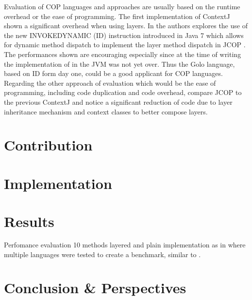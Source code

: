\documentclass[a4paper]{article}
\begin{document}
Evaluation of COP languages and approaches are usually based on the runtime overhead or the ease of programming. The first implementation of ContextJ \cite{haupt_contextj:_2011} shown a significant overhead when using layers. In \cite{appeltauer_layered_2010} the authors explores the use of the new INVOKEDYNAMIC (ID) instruction introduced in Java 7 which allows for dynamic method dispatch to implement the layer method dispatch in JCOP \cite{appeltauer_declarative_2013}. The performances shown are encouraging especially since at the time of writing the implementation of in the JVM was not yet over. Thus the Golo language, based on ID form day one, could be a good applicant for COP languages. Regarding the other approach of evaluation which would be the ease of programming, including code duplication and code overhead, \cite{appeltauer_declarative_2013} compare JCOP to the previous ContextJ and notice a significant reduction of code due to layer inheritance mechanism and context classes to better compose layers.

 
\section{Contribution}
\label{section:contribution}

\section{Implementation}
\label{section:implementation}

\section{Results}
\label{section:results}

Perfomance evaluation
10 methods layered and plain implementation as in \cite{appeltauer_comparison_2009} where multiple languages were tested to create a benchmark, similar to \cite{kamina_eventcj:_2011}.

\section{Conclusion \& Perspectives}
\label{section:conclusion}


%
%



\end{document}
